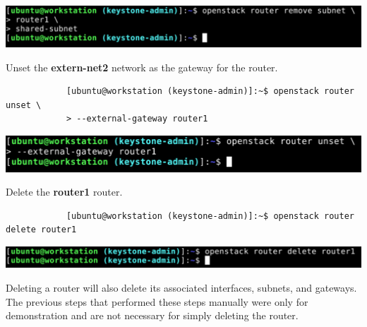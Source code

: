 \documentclass[letterpaper, 12pt]{article}
\begin{document}
\begin{enumerate}
\begin{labstep}
        \begin{center}
            \includegraphics[width=\linewidth]{images/part2/step9.png}
        \end{center}
    \end{labstep}

    \begin{labstep}
        Unset the \textbf{extern-net2} network as the gateway for the router.
        \begin{lstlisting}
            [ubuntu@workstation (keystone-admin)]:~$ openstack router unset \
            > --external-gateway router1
        \end{lstlisting}

        \begin{center}
            \includegraphics[width=\linewidth]{images/part2/step10.png}
        \end{center}
    \end{labstep}

    \begin{labstep}
        Delete the \textbf{router1} router.
        \begin{lstlisting}
            [ubuntu@workstation (keystone-admin)]:~$ openstack router delete router1
        \end{lstlisting}

        \begin{center}
            \includegraphics[width=\linewidth]{images/part2/step11.png}
        \end{center}
    \end{labstep}

    \begin{notebox}
        Deleting a router will also delete its associated interfaces, subnets, and gateways.
        The previous steps that performed these steps manually were only for demonstration and are not necessary for simply deleting the router.
    \end{notebox}


\end{enumerate}
\end{document}
